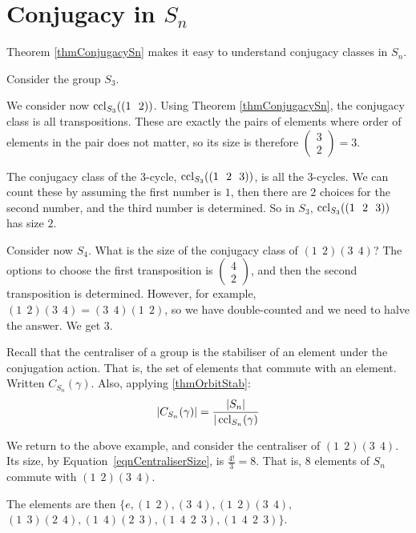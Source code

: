 \documentclass[../Main.tex]{subfiles}
\begin{document}
\section{Conjugacy in \texorpdfstring{$S_n$}{Sn}}
Theorem \ref{thmConjugacySn} makes it easy to understand conjugacy classes in $S_n$.
\begin{example}
Consider the group $S_3$.\par
We consider now $\operatorname{ccl}_{S_3}((1~~2))$. Using Theorem \ref{thmConjugacySn}, the conjugacy class is all transpositions. These are exactly the pairs of elements where order of elements in the pair does not matter, so its size is therefore $\begin{pmatrix}3 \\ 2\end{pmatrix} = 3$.\par
The conjugacy class of the $3$-cycle, $\operatorname{ccl}_{S_3}((1~~2~~3))$, is all the $3$-cycles. We can count these by assuming the first number is $1$, then there are $2$ choices for the second number, and the third number is determined. So in $S_3$, $\operatorname{ccl}_{S_3}((1~~2~~3))$ has size $2$.\par
\end{example}
\begin{example}
    Consider now $S_4$.
    What is the size of the conjugacy class of $(1~~2)(3~~4)$? The options to choose the first transposition is $\begin{pmatrix}4 \\ 2\end{pmatrix}$, and then the second transposition is determined. However, for example, $(1~~2)(3~~4) = (3~~4)(1~~2)$, so we have double-counted and we need to halve the answer. We get $3$.
\end{example}
Recall that the centraliser of a group is the stabiliser of an element under the conjugation action. That is, the set of elements that commute with an element. Written $C_{S_n}(\gamma)$. Also, applying \ref{thmOrbitStab}:
\begin{equation}
|C_{S_n}(\gamma)| = \frac{|S_n|}{|\operatorname{ccl}_{S_n}(\gamma)}
\label{eqnCentraliserSize}
\end{equation}
\begin{example}
We return to the above example, and consider the centraliser of $(1~~2)(3~~4)$. Its size, by Equation~\ref{eqnCentraliserSize}, is $\frac{4!}{3} = 8$. That is, $8$ elements of $S_n$ commute with $(1~~2)(3~~4)$.\par
The elements are then $\{e, (1~~2), (3~~4), (1~~2)(3~~4),$\newline$(1~~3)(2~~4), (1~~4)(2~~3), (1~~4~~2~~3), (1~~4~~2~~3)\}$.
\end{example}
\end{document}
